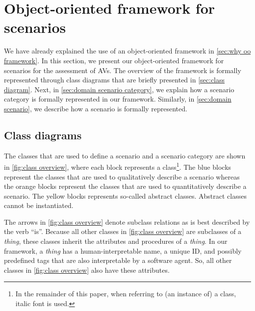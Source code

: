 \cstartb
\section{Object-oriented framework for scenarios}
\label{sec:oo framework}
\cendb

We have already explained the use of an \cstartb object-oriented framework \cendb in \cref{sec:why oo framework}. In this section, we present our \cstartb object-oriented framework \cendb for scenarios for the assessment of AVs. 
The \cstartb overview of the framework \cendb is formally represented through \cstartb class diagrams \cendb that are briefly presented in \cref{sec:class diagram}. Next, in \cref{sec:domain scenario category}, we explain how a scenario category is formally represented \cstartb in our framework\cendb. Similarly, in \cref{sec:domain scenario}, we describe how a scenario is formally represented. 



\cstartb
\subsection{Class diagrams}\cendb
\label{sec:class diagram}

The classes that are used to define a scenario and a scenario category are shown in \cref{fig:class overview}, where each block represents a class\footnote{In the remainder of this paper, when referring to (an instance of) a class, italic font is used.}.
The blue blocks represent the classes that are used to qualitatively describe a scenario whereas the orange blocks represent the classes that are used to quantitatively describe a scenario. \cstartb The yellow blocks represents so-called abstract classes. Abstract classes cannot be instantiated. \cendb

\begin{figure*}[t]
	\centering
	
	\caption{Schematic overview of most classes of our object-oriented framework.}
	\label{fig:class overview}
\end{figure*}

The arrows in \cref{fig:class overview} denote subclass relations as is best described by the verb ``is''. Because all other classes in \cref{fig:class overview} are subclasses of a \textit{thing}, these classes inherit the attributes and procedures of a \textit{thing}. In our framework, a \textit{thing} has a human-interpretable name, a unique ID, and possibly predefined tags that are also interpretable by a software agent. So, all other classes in \cref{fig:class overview} also have these attributes. 

